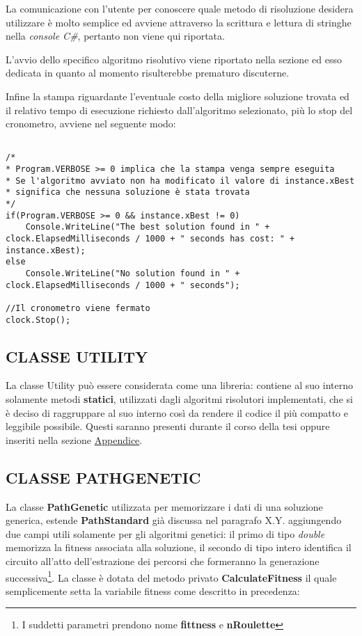 \documentclass[11pt]{article}
\begin{document}
La comunicazione con l'utente per conoscere quale metodo di risoluzione desidera utilizzare è molto semplice ed avviene attraverso la scrittura e lettura di stringhe nella \textit{console C\#}, pertanto non viene qui riportata.

L'avvio dello specifico algoritmo risolutivo viene riportato nella sezione ed esso dedicata in quanto al momento risulterebbe prematuro discuterne.

Infine la stampa riguardante l'eventuale costo della migliore soluzione trovata ed il relativo tempo di esecuzione richiesto dall'algoritmo selezionato, più lo stop del cronometro, avviene nel seguente modo:

\begin{lstlisting}

/*
* Program.VERBOSE >= 0 implica che la stampa venga sempre eseguita
* Se l'algoritmo avviato non ha modificato il valore di instance.xBest
* significa che nessuna soluzione è stata trovata
*/
if(Program.VERBOSE >= 0 && instance.xBest != 0)
    Console.WriteLine("The best solution found in " + clock.ElapsedMilliseconds / 1000 + " seconds has cost: " + instance.xBest);
else
    Console.WriteLine("No solution found in " + clock.ElapsedMilliseconds / 1000 + " seconds");

//Il cronometro viene fermato
clock.Stop();

\end{lstlisting}

\subsection*{CLASSE UTILITY}
\label{sec:ClasseUtilityS}

La classe Utility può essere considerata come una libreria: contiene al suo interno solamente metodi \textbf{statici}, utilizzati dagli algoritmi risolutori implementati, che si è deciso di raggruppare al suo interno così da rendere il codice il più compatto e leggibile possibile. Questi saranno presenti durante il corso della tesi oppure inseriti nella sezione \hyperref[sec:AppendiceS]{Appendice}.

\subsection*{CLASSE PATHGENETIC}
\label{sec:ClassePathGeneticS}

La classe \textbf{PathGenetic} utilizzata per memorizzare i dati di una soluzione generica, estende \textbf{PathStandard} già discussa nel paragrafo X.Y. aggiungendo due campi utili solamente per gli algoritmi genetici: il primo di tipo \textit{double} memorizza la fitness associata alla soluzione, il secondo di tipo intero identifica il circuito all'atto dell'estrazione dei percorsi che formeranno la generazione successiva\footnote{I suddetti parametri prendono nome \textbf{fittness} e \textbf{nRoulette}}.
La classe è dotata del metodo privato \textbf{CalculateFitness} il quale semplicemente setta la variabile fitness come descritto in precedenza:
\end{document}
